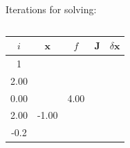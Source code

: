 \begin{frame}[fragile]
    Iterations for solving:\newline
    \begin{columns}
    \begin{tabular}{|c|c|c|c|c|}
      \hline
      \( i \) & \( \mathbf{x} \) & \( f \) & \( \mathbf{J} \) & \( \delta \mathbf{x} \) \\
      \hline
      1 & \(\begin{bmatrix}1.00\\2.00\end{bmatrix} \)  & \(\begin{bmatrix}1.00\\0.00\end{bmatrix} \)               & \(\begin{bmatrix} 2.00  & 4.00  \\ 2.00  & -1.00 \end{bmatrix}\) & \(\begin{bmatrix} -0.1                 \\ -0.2                 \end{bmatrix}\) \\

\end{tabular}
\end{columns}
\end{frame}

